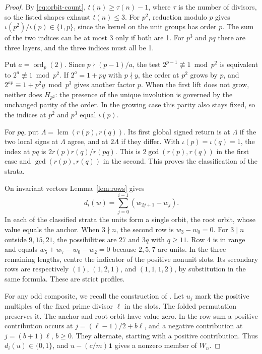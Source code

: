 \documentclass[11pt,reqno]{amsart}
\newcommand{\ord}{\operatorname{ord}}
\begin{document}
\begin{proof}
By \eqref{eq:orbit-count}, \(t(n)\ge\tau(n)-1\), where \(\tau\) is the number of divisors, so the listed shapes exhaust \(t(n)\le3\). For \(p^2\), reduction modulo \(p\) gives \(\iota(p^2)/\iota(p)\in\{1,p\}\), since the kernel on the unit groups has order \(p\). The sum of the two indices can be at most 3 only if both are 1. For \(p^3\) and \(pq\) there are three layers, and the three indices must all be 1.

Put \(a=\ord_p(2)\). Since \(p\nmid(p-1)/a\), the test \(2^{p-1}\not\equiv1\bmod p^2\) is equivalent to \(2^a\not\equiv1\bmod p^2\). If \(2^a=1+py\) with \(p\nmid y\), the order at \(p^2\) grows by \(p\), and \(2^{ap}\equiv1+p^2y\bmod p^3\) gives another factor \(p\). When the first lift does not grow, neither does \(H_{p^2}\): the presence of the unique involution is governed by the unchanged parity of the order. In the growing case this parity also stays fixed, so the indices at \(p^2\) and \(p^3\) equal \(\iota(p)\).

For \(pq\), put \(\Lambda=\operatorname{lcm}(r(p),r(q))\). Its first global signed return is at \(\Lambda\) if the two local signs at \(\Lambda\) agree, and at \(2\Lambda\) if they differ. With \(\iota(p)=\iota(q)=1\), the index at \(pq\) is \(2r(p)r(q)/r(pq)\). This is \(2\gcd(r(p),r(q))\) in the first case and \(\gcd(r(p),r(q))\) in the second. This proves the classification of the strata.

On invariant vectors Lemma~\ref{lem:rows} gives
\[
 d_i(w)=\sum_{j=0}^{i-1}(w_{2j+1}-w_j).
\]
In each of the classified strata the units form a single orbit, the root orbit, whose value equals the anchor. When \(3\nmid n\), the second row is \(w_3-w_0=0\). For \(3\mid n\) outside \(9,15,21\), the possibilities are \(27\) and \(3q\) with \(q\ge11\). Row 4 is in range and equals \(w_5+w_7-w_0-w_2=0\) because \(2,5,7\) are units. In the three remaining lengths, centre the indicator of the positive nonunit slots. Its secondary rows are respectively \((1)\), \((1,2,1)\), and \((1,1,1,2)\), by substitution in the same formula. These are strict profiles.

For any odd composite, we recall the construction of \cite[Section~3]{G10}. Let \(u_j\) mark the positive multiples of the fixed prime divisor \(\ell\) in the slots. The folded permutation preserves it. The anchor and root orbit have value zero. In the row sum a positive contribution occurs at \(j=(\ell-1)/2+b\ell\), and a negative contribution at \(j=(b+1)\ell\), \(b\ge0\). They alternate, starting with a positive contribution. Thus \(d_i(u)\in\{0,1\}\), and \(u-(c/m)\mathbf1\) gives a nonzero member of \(W_n\).


\end{proof}
\end{document}

